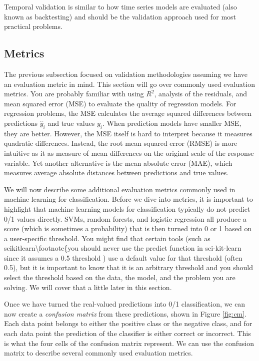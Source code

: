 \documentclass[]{krantz}
\begin{document}
Temporal validation is similar to how time series models are evaluated
(also known as backtesting) and should be the validation approach used
for most practical problems.

\subsection{Metrics}\label{metrics}

The previous subsection focused on validation methodologies assuming we
have an evaluation metric in mind. This section will go over commonly
used evaluation metrics. You are probably familiar with using \(R^2\),
analysis of the residuals, and mean squared error (MSE) to evaluate the
quality of regression models. For regression problems, the MSE
calculates the average squared differences between predictions
\(\hat{y}_i\) and true values \(y_i\). When prediction models have
smaller MSE, they are better. However, the MSE itself is hard to
interpret because it measures quadratic differences. Instead, the root
mean squared error (RMSE) is more intuitive as it as measure of mean
differences on the original scale of the response variable. Yet another
alternative is the mean absolute error (MAE), which measures average
absolute distances between predictions and true values.

We will now describe some additional evaluation metrics commonly used in
machine learning for classification. Before we dive into metrics, it is
important to highlight that machine learning models for classification
typically do not predict 0/1 values directly. SVMs, random forests, and
logistic regression all produce a score (which is sometimes a
probability) that is then turned into 0 or 1 based on a user-specific
threshold. You might find that certain tools (such as
scikitlearn\textbackslash{}footnote\{you should never use the predict
function in sci-kit-learn since it assumes a 0.5 threshold ) use a
default value for that threshold (often 0.5), but it is important to
know that it is an arbitrary threshold and you should select the
threshold based on the data, the model, and the problem you are solving.
We will cover that a little later in this section.

Once we have turned the real-valued predictions into 0/1 classification,
we can now create a \emph{confusion matrix} from these predictions,
shown in Figure \ref{fig:cm}. Each data point belongs to either the
positive class or the negative class, and for each data point the
prediction of the classifier is either correct or incorrect. This is
what the four cells of the confusion matrix represent. We can use the
confusion matrix to describe several commonly used evaluation metrics.
\end{document}
